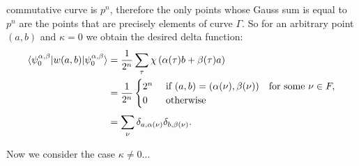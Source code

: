 \documentclass[a4paper]{article}
\begin{document}
  commutative curve is $p^{n}$, therefore the only points
  whose Gauss sum is equal to $p^{n}$ are the points that
  are precisely elements of curve $\Gamma$.  So for an
  arbitrary point $(a,b)$ and $\kappa = 0$ we obtain the
  desired delta function:
  \begin{align}
    \braket{
      \psi_{0}^{\alpha,\beta}|w(a,b)|
      \psi_{0}^{\alpha,\beta}
    }
    &= \frac{1}{2^{n}}
    \sum_{\tau}^{} 
    \chi\left( \alpha(\tau)b + \beta(\tau)a \right)  \\
    &= \frac{1}{2^{n}}\begin{cases}
      2^{n} & \text{ if } (a,b) =
      (\alpha(\nu),\beta(\nu)) \quad \text{for some } \nu
      \in F,\\
      0 & \text{ otherwise }
    \end{cases} \\
    &= \sum_{\nu}^{}
    \delta_{a,\alpha(\nu)} \delta_{b,\beta(\nu)}.
  \end{align}

  Now we consider the case $\kappa \neq 0\ldots$
\end{document}
